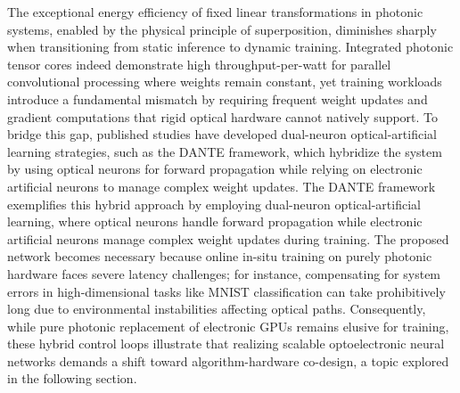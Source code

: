\documentclass[11pt]{article}
\begin{document}
The exceptional energy efficiency of fixed linear transformations in photonic systems, enabled by the physical principle of superposition, diminishes sharply when transitioning from static inference to dynamic training. Integrated photonic tensor cores indeed demonstrate high throughput-per-watt for parallel convolutional processing where weights remain constant, yet training workloads introduce a fundamental mismatch by requiring frequent weight updates and gradient computations that rigid optical hardware cannot natively support. To bridge this gap, published studies have developed dual-neuron optical-artificial learning strategies, such as the DANTE framework, which hybridize the system by using optical neurons for forward propagation while relying on electronic artificial neurons to manage complex weight updates. The DANTE framework exemplifies this hybrid approach by employing dual-neuron optical-artificial learning, where optical neurons handle forward propagation while electronic artificial neurons manage complex weight updates during training. \citep{doi_10_1038_s41467_023_42984_y_7fc109e3} The proposed network becomes necessary because online in-situ training on purely photonic hardware faces severe latency challenges; for instance, compensating for system errors in high-dimensional tasks like MNIST classification can take prohibitively long due to environmental instabilities affecting optical paths. Consequently, while pure photonic replacement of electronic GPUs remains elusive for training, these hybrid control loops illustrate that realizing scalable optoelectronic neural networks demands a shift toward algorithm-hardware co-design, a topic explored in the following section. \citep{doi_10_1515_nanoph_2022_0423_38a2c3ec} \citep{doi_10_1038_s41467_023_42984_y_7fc109e3} \citep{doi_10_1038_s41467_022_35772_7_90150ade}
\end{document}
